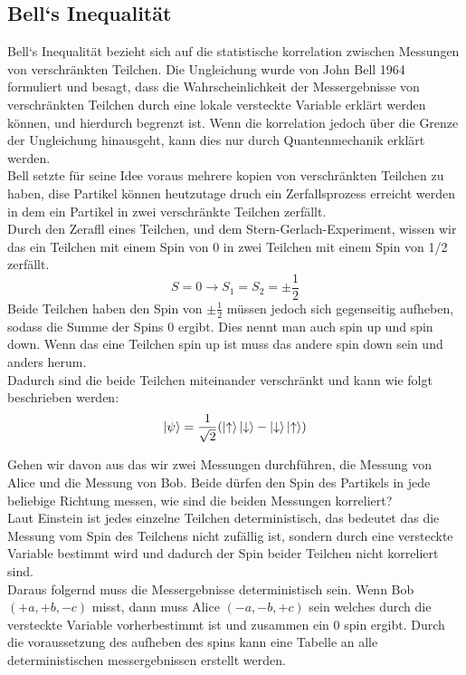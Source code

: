 \subsection{Bell`s Inequalität}
\label{subsec:bells_inequality}
Bell`s Inequalität bezieht sich auf die statistische korrelation zwischen Messungen von verschränkten Teilchen.
Die Ungleichung wurde von John Bell 1964 formuliert und besagt, dass die Wahrscheinlichkeit der Messergebnisse von verschränkten Teilchen durch eine lokale versteckte Variable erklärt werden können, und hierdurch begrenzt ist.
Wenn die korrelation jedoch über die Grenze der Ungleichung hinausgeht, kann dies nur durch Quantenmechanik erklärt werden.\\

Bell setzte für seine Idee voraus mehrere kopien von verschränkten Teilchen zu haben, dise Partikel können heutzutage druch ein Zerfallsprozess erreicht werden in dem ein Partikel in zwei verschränkte Teilchen zerfällt.\\

Durch den Zerafll eines Teilchen, und dem Stern-Gerlach-Experiment, wissen wir das ein Teilchen mit einem Spin von 0 in zwei Teilchen mit einem Spin von 1/2 zerfällt.
\begin{equation}
    S = 0 \rightarrow S_1 = S_2 = \pm\frac{1}{2}
\end{equation}
Beide Teilchen haben den Spin von $\pm\frac{1}{2}$ müssen jedoch sich gegenseitig aufheben, sodass die Summe der Spins 0 ergibt.
Dies nennt man auch spin up und spin down. Wenn das eine Teilchen spin up ist muss das andere spin down sein und anders herum.\\
Dadurch sind die beide Teilchen miteinander verschränkt und kann wie folgt beschrieben werden:
\begin{equation}
    \ket{\psi} = \frac{1}{\sqrt{2}}(\ket{\uparrow}\ket{\downarrow} - \ket{\downarrow}\ket{\uparrow})
\end{equation}

Gehen wir davon aus das wir zwei Messungen durchführen, die Messung von Alice und die Messung von Bob.
Beide dürfen den Spin des Partikels in jede beliebige Richtung messen, wie sind die beiden Messungen korreliert?\\
Laut Einstein ist jedes einzelne Teilchen deterministisch, das bedeutet das die Messung vom Spin des Teilchens nicht zufällig ist, sondern durch eine versteckte Variable bestimmt wird und dadurch der Spin beider Teilchen nicht korreliert sind.\\
Daraus folgernd muss die Messergebnisse deterministisch sein. Wenn Bob $(+a, +b, -c)$ misst, dann muss Alice $(-a, -b, +c)$ sein welches durch die versteckte Variable vorherbestimmt ist und zusammen ein 0 spin ergibt.
Durch die voraussetzung des aufheben des spins kann eine Tabelle an alle deterministischen messergebnissen erstellt werden.

